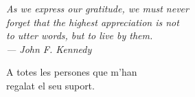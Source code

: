 \begin{dedication}
    \emph{
    As we express our gratitude, we must never\\
    forget that the highest appreciation is not\\
    to utter words, but to live by them.}\\\vspace{0.25cm}
    \emph{--- John F. Kennedy}\\\vspace{1cm}

    A totes les persones que m'han\\
    regalat el seu suport.
\end{dedication}
